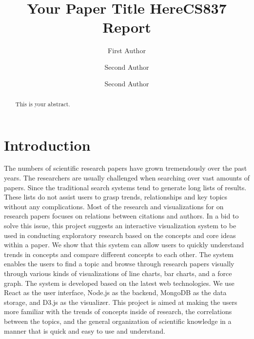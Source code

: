 \documentclass[sigconf]{acmart}
\title{Your Paper Title Here}
\author{First Author}
\affiliation{%
  \institution{Your Institution}
  \city{City}
  \country{Country}
}
\author{Second Author}
\affiliation{%
  \institution{Your Institution}
  \city{City}
  \country{Country}
}
\author{Second Author}
\affiliation{%
  \institution{Your Institution}
  \city{City}
  \country{Country}
}
\title{CS837 Report}
\begin{document}
\begin{abstract}
This is your abstract.
\end{abstract}

\maketitle


\section{Introduction}

The numbers of scientific research papers have grown tremendously over the past years. The researchers are usually challenged when searching over vast amounts of papers. Since the traditional search systems tend to generate long lists of results. These lists do not assist users to grasp trends, relationships and key topics without any complications. Most of the research and visualizations for on research papers focuses on relations between citations and authors. In a bid to solve this issue, this project suggests an interactive visualization system to be used in conducting exploratory research based on the concepts and core ideas within a paper. We show that this system can allow users to quickly understand trends in concepts and compare different concepts to each other. The system enables the users to find a topic and browse through research papers visually through various kinds of visualizations of line charts, bar charts, and a force graph. The system is developed based on the latest web technologies. We use React as the user interface, Node.js as the backend, MongoDB as the data storage, and D3.js as the visualizer. This project is aimed at making the users more familiar with the trends of concepts inside of research, the correlations between the topics, and the general organization of scientific knowledge in a manner that is quick and easy to use and understand.
\end{document}
